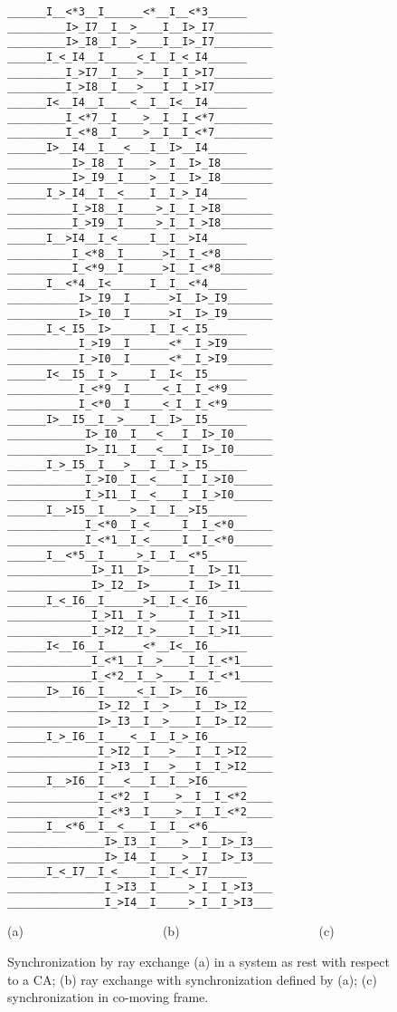 \documentclass[pre,preprint,showpacs,showkeys,amsfonts]{revtex4}
\begin{document}
\begin{figure}
{\begin{verbatim}
______I__<*3__I______<*__I__<*3______   _________I>_I7__I__>____I__I>_I7_________   _________I>_I8__I__>____I__I>_I7_________
______I_<_I4__I_____<_I__I_<_I4______   _________I_>I7__I___>___I__I_>I7_________   _________I_>I8__I___>___I__I_>I7_________
______I<__I4__I____<__I__I<__I4______   _________I_<*7__I____>__I__I_<*7_________   _________I_<*8__I____>__I__I_<*7_________
______I>__I4__I___<___I__I>__I4______   __________I>_I8__I____>__I__I>_I8________   __________I>_I9__I____>__I__I>_I8________
______I_>_I4__I__<____I__I_>_I4______   __________I_>I8__I_____>_I__I_>I8________   __________I_>I9__I_____>_I__I_>I8________
______I__>I4__I_<_____I__I__>I4______   __________I_<*8__I______>I__I_<*8________   __________I_<*9__I______>I__I_<*8________
______I__<*4__I<______I__I__<*4______   ___________I>_I9__I______>I__I>_I9_______   ___________I>_I0__I______>I__I>_I9_______
______I_<_I5__I>______I__I_<_I5______   ___________I_>I9__I______<*__I_>I9_______   ___________I_>I0__I______<*__I_>I9_______
______I<__I5__I_>_____I__I<__I5______   ___________I_<*9__I_____<_I__I_<*9_______   ___________I_<*0__I_____<_I__I_<*9_______
______I>__I5__I__>____I__I>__I5______   ____________I>_I0__I___<___I__I>_I0______   ____________I>_I1__I___<___I__I>_I0______
______I_>_I5__I___>___I__I_>_I5______   ____________I_>I0__I__<____I__I_>I0______   ____________I_>I1__I__<____I__I_>I0______
______I__>I5__I____>__I__I__>I5______   ____________I_<*0__I_<_____I__I_<*0______   ____________I_<*1__I_<_____I__I_<*0______
______I__<*5__I_____>_I__I__<*5______   _____________I>_I1__I>______I__I>_I1_____   _____________I>_I2__I>______I__I>_I1_____
______I_<_I6__I______>I__I_<_I6______   _____________I_>I1__I_>_____I__I_>I1_____   _____________I_>I2__I_>_____I__I_>I1_____
______I<__I6__I______<*__I<__I6______   _____________I_<*1__I__>____I__I_<*1_____   _____________I_<*2__I__>____I__I_<*1_____
______I>__I6__I_____<_I__I>__I6______   ______________I>_I2__I__>____I__I>_I2____   ______________I>_I3__I__>____I__I>_I2____
______I_>_I6__I____<__I__I_>_I6______   ______________I_>I2__I___>___I__I_>I2____   ______________I_>I3__I___>___I__I_>I2____
______I__>I6__I___<___I__I__>I6______   ______________I_<*2__I____>__I__I_<*2____   ______________I_<*3__I____>__I__I_<*2____
______I__<*6__I__<____I__I__<*6______   _______________I>_I3__I____>__I__I>_I3___   _______________I>_I4__I____>__I__I>_I3___
______I_<_I7__I_<_____I__I_<_I7______   _______________I_>I3__I_____>_I__I_>I3___   _______________I_>I4__I_____>_I__I_>I3___
\end{verbatim}}
(a) $\qquad \qquad \qquad$ $\qquad \qquad $
(b) $\qquad \qquad \qquad$ $\qquad \qquad $
(c)
\caption{Synchronization by ray exchange (a) in a system as rest with respect to a CA;
(b) ray exchange with synchronization defined by (a);
(c) synchronization in co-moving frame. \label{synchro}}
\end{figure}
\end{document}
